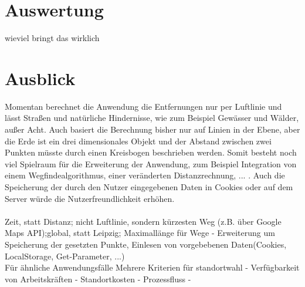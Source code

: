 \documentclass[a4paper, twoside, 12pt]{scrreprt}
\begin{document}
\section{Auswertung}
wieviel bringt das wirklich
\section{Ausblick}
Momentan berechnet die Anwendung die Entfernungen nur per Luftlinie und lässt Straßen und natürliche Hindernisse, wie zum Beispiel Gewässer und Wälder, außer Acht.
Auch basiert die Berechnung bisher nur auf Linien in der Ebene, aber die Erde ist ein drei dimensionales Objekt und der Abstand zwischen zwei Punkten müsste durch einen Kreisbogen beschrieben werden.
Somit besteht noch viel Spielraum für die Erweiterung der Anwendung, zum Beispiel Integration von einem Wegfindealgorithmus, einer veränderten Distanzrechnung, ... .
Auch die Speicherung der durch den Nutzer eingegebenen Daten in Cookies oder auf dem Server würde die Nutzerfreundlichkeit erhöhen. \\\\
Zeit, statt Distanz; nicht Luftlinie, sondern kürzesten Weg (z.B. über Google Maps API);global, statt Leipzig; Maximallänge für Wege
- Erweiterung um Speicherung der gesetzten Punkte, Einlesen von vorgebebenen Daten(Cookies, LocalStorage, Get-Parameter, ...)\\

Für ähnliche Anwendungsfälle
Mehrere Kriterien für standortwahl
- Verfügbarkeit von Arbeitskräften
- Standortkosten
- Prozessfluss
- 

{}

\end{document}
